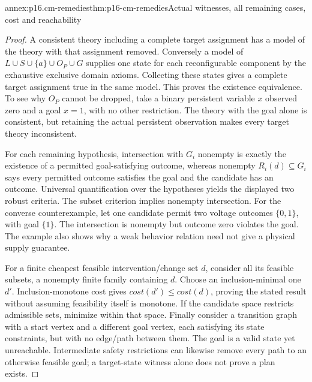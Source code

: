 \begin{annexitem}{annex:p16.cm-remedies}{thm:p16-cm-remedies}{Actual witnesses, all remaining cases, cost and reachability}
\begin{proof}
A consistent theory including a complete target assignment has a model
of the theory with that assignment removed. Conversely a model of
\(L\cup S\cup\{a\}\cup O_P\cup G\) supplies one state for each
reconfigurable component by the exhaustive exclusive domain axioms.
Collecting these states gives a complete target assignment true in the
same model. This proves the existence equivalence. To see why \(O_P\)
cannot be dropped, take a binary persistent variable \(x\) observed zero
and a goal \(x=1\), with no other restriction. The theory with the
goal alone is consistent, but retaining the actual persistent observation
makes every target theory inconsistent.

For each remaining hypothesis, intersection with \(G_i\) nonempty is
exactly the existence of a permitted goal-satisfying outcome, whereas
nonempty \(R_i(d)\subseteq G_i\) says every permitted outcome satisfies
the goal and the candidate has an outcome. Universal quantification over
the hypotheses yields the displayed two robust criteria. The subset
criterion implies nonempty intersection. For the converse counterexample,
let one candidate permit two voltage outcomes \(\{0,1\}\), with goal
\(\{1\}\). The intersection is nonempty but outcome zero violates
the goal. The example also shows why a weak behavior relation need not
give a physical supply guarantee.

For a finite cheapest feasible intervention/change set \(d\), consider
all its feasible subsets, a nonempty finite family containing \(d\).
Choose an inclusion-minimal one \(d'\). Inclusion-monotone cost gives
\(cost(d')\le cost(d)\), proving the stated result without assuming
feasibility itself is monotone. If the candidate space restricts admissible
sets, minimize within that space. Finally consider a transition graph
with a start vertex and a different goal vertex, each satisfying its
state constraints, but with no edge/path between them. The goal is a
valid state yet unreachable. Intermediate safety restrictions can likewise
remove every path to an otherwise feasible goal; a target-state witness
alone does not prove a plan exists.
\end{proof}
\end{annexitem}
